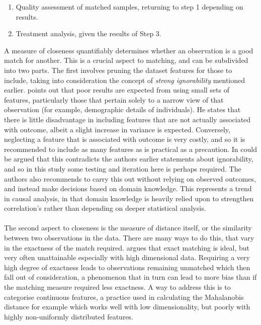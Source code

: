 {{\begin {enumerate}
\item{Quality assessment of matched samples, returning to step 1 depending on results.}
\item{Treatment analysis, given the results of Step 3.}
\end{enumerate}
A measure of closeness quantifiably determines whether an observation is a good match for another. This is a crucial aspect to matching, and can be subdivided into two parts. The first involves pruning the dataset features for those to include, taking into consideration the concept of {\it strong ignorability} mentioned earlier. \cite{stuart2010matching} points out that poor results are expected from using small sets of features, particularly those that pertain solely to a narrow view of that observation (for example, demographic details of individuals). He states that there is little disadvantage in including features that are not actually associated with outcome, albeit a slight increase in variance is expected. Conversely, neglecting a feature that is associated with outcome is very costly, and so it is recommended to include as many features as is practical as a precaution. In could be argued that this contradicts the authors earlier statements about ignorability, and so in this study some testing and iteration here is perhaps required. The authors also recommends to carry this out without relying on observed outcomes, and instead make decisions based on domain knowledge. This represents a trend in causal analysis, in that domain knowledge is heavily relied upon to strengthen correlation's rather than depending on deeper statistical analysis. \\\\
The second aspect to closeness is the measure of distance itself, or the similarity between two observations in the data. There are many ways to do this, that vary in the exactness of the match required. \cite{stuart2010matching} argues that exact matching is ideal, but very often unattainable especially with high dimensional data. Requiring a very high degree of exactness leads to observations remaining unmatched which then fall out of consideration, a phenomenon that in turn can lead to more bias than if the matching measure required less exactness. A way to address this is to categorise continuous features, a practice used in calculating the Mahalanobis distance for example which works well with low dimensionality, but poorly with highly non-uniformly distributed features.
\\\\ 
}}
